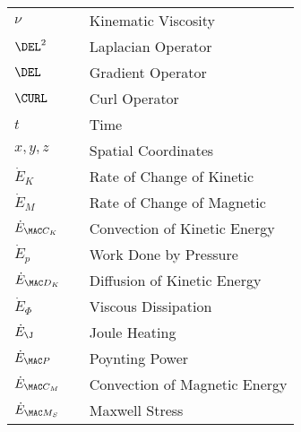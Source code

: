 \begin{table}[ht!]
\begin{adjustbox}{max width=\TW}
\begin{tabular}{ l c l }
$\nu$                 & \hspace{3em} &    Kinematic Viscosity           \\
$\DEL^2$              & \hspace{3em} &    Laplacian Operator            \\
$\DEL$                & \hspace{3em} &    Gradient Operator             \\
$\CURL$               & \hspace{3em} &    Curl Operator                 \\
$t$                   & \hspace{3em} &    Time                          \\
$x,y,z$               & \hspace{3em} &    Spatial Coordinates           \\
$\dot{E}_K$           & \hspace{3em} &    Rate of Change of Kinetic     \\
$\dot{E}_M$           & \hspace{3em} &    Rate of Change of Magnetic    \\
$\dot{E}_{\MAC C_K}$  & \hspace{3em} &    Convection of Kinetic Energy  \\
$\dot{E}_{p}$         & \hspace{3em} &    Work Done by Pressure         \\
$\dot{E}_{\MAC D_K}$  & \hspace{3em} &    Diffusion of Kinetic Energy   \\
$\dot{E}_{\Phi}$      & \hspace{3em} &    Viscous Dissipation           \\
$\dot{E}_\J$          & \hspace{3em} &    Joule Heating                 \\
$\dot{E}_{\MAC P}$    & \hspace{3em} &    Poynting Power                \\
$\dot{E}_{\MAC C_M}$  & \hspace{3em} &    Convection of Magnetic Energy \\
$\dot{E}_{\MAC M_S}$  & \hspace{3em} &    Maxwell Stress                \\
\end{tabular} \end{adjustbox} \end{table}

